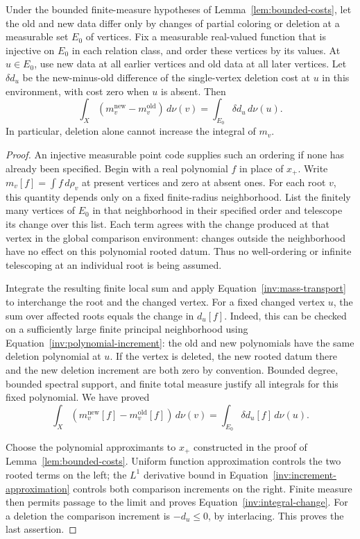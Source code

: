 \begin{lemma}\label{lem:integral-change}
Under the bounded finite-measure hypotheses of
Lemma~\ref{lem:bounded-costs}, let the old and new data differ only by
changes of partial coloring or deletion at a measurable set $E_0$ of
vertices.  Fix a measurable real-valued function that is injective on
$E_0$ in each relation class, and order these vertices by its values.
At $u\in E_0$, use new data at all earlier vertices and old data at all
later vertices.  Let $\delta d_u$ be the new-minus-old difference of the
single-vertex deletion cost at $u$ in this environment, with cost zero
when $u$ is absent.  Then
\begin{equation}\label{inv:integral-change}
 \int_X(m_v^{\mathrm{new}}-m_v^{\mathrm{old}})\,d\nu(v)
       =\int_{E_0}\delta d_u\,d\nu(u).
\end{equation}
In particular, deletion alone cannot increase the integral of $m_v$.
\end{lemma}

\begin{proof}
An injective measurable point code supplies such an ordering if none has
already been specified.  Begin with a real polynomial $f$ in place of
$x_+$.  Write $m_v[f]=\int f\,d\rho_v$ at present vertices and zero at
absent ones.  For each root $v$, this quantity depends only on a fixed
finite-radius neighborhood.  List the finitely many vertices of $E_0$ in
that neighborhood in their specified order and telescope its change over
this list.  Each term agrees with the change produced at that vertex in
the global comparison environment: changes outside the neighborhood have
no effect on this polynomial rooted datum.  Thus no well-ordering or
infinite telescoping at an individual root is being assumed.

Integrate the resulting finite local sum and apply
Equation~\eqref{inv:mass-transport} to interchange the root and the changed
vertex.  For a fixed changed vertex $u$, the sum over affected roots equals
the change in $d_u[f]$.  Indeed, this can be checked on a sufficiently
large finite principal neighborhood using
Equation~\eqref{inv:polynomial-increment}: the old and new polynomials have
the same deletion polynomial at $u$.  If the vertex is deleted, the new
rooted datum there and the new deletion increment are both zero by
convention.  Bounded degree, bounded spectral support, and finite total
measure justify all integrals for this fixed polynomial.  We have proved
\[
 \int_X(m_v^{\mathrm{new}}[f]-m_v^{\mathrm{old}}[f])\,d\nu(v)
       =\int_{E_0}\delta d_u[f]\,d\nu(u).
\]

Choose the polynomial approximants to $x_+$ constructed in the proof of
Lemma~\ref{lem:bounded-costs}.  Uniform function approximation controls
the two rooted terms on the left; the $L^1$ derivative bound in
Equation~\eqref{inv:increment-approximation} controls both comparison
increments on the right.  Finite measure then permits passage to the
limit and proves Equation~\eqref{inv:integral-change}.  For a deletion
the comparison increment is $-d_u\leq0$, by interlacing.  This proves the
last assertion.
\end{proof}

